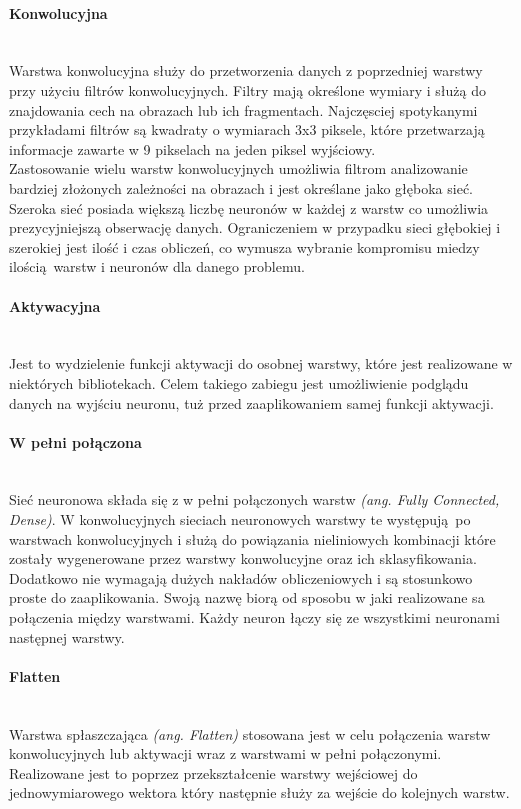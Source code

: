 \paragraph{Konwolucyjna}  \mbox{}\\
Warstwa konwolucyjna służy do przetworzenia danych z poprzedniej warstwy przy użyciu
filtrów konwolucyjnych. Filtry mają określone wymiary i służą do znajdowania cech
na obrazach lub ich fragmentach. Najczęsciej spotykanymi przykładami filtrów są
kwadraty o wymiarach 3x3 piksele, które przetwarzają informacje zawarte w 9 pikselach
na jeden piksel wyjściowy.\\
Zastosowanie wielu warstw konwolucyjnych umożliwia filtrom analizowanie bardziej złożonych
zależności na obrazach i jest określane jako głęboka sieć. Szeroka sieć posiada większą
liczbę neuronów w każdej z warstw co umożliwia prezycyjniejszą obserwację danych.
Ograniczeniem w przypadku sieci głębokiej i szerokiej jest ilość i czas obliczeń, co
wymusza wybranie kompromisu miedzy ilością warstw i neuronów dla danego problemu.

\paragraph{Aktywacyjna}  \mbox{}\\
Jest to wydzielenie funkcji aktywacji do osobnej warstwy, które jest realizowane
w niektórych bibliotekach. Celem takiego zabiegu jest umożliwienie podglądu danych
na wyjściu neuronu, tuż przed zaaplikowaniem samej funkcji aktywacji.

\paragraph{W pełni połączona}  \mbox{}\\
Sieć neuronowa składa się z w pełni połączonych warstw \textit{(ang. Fully Connected, Dense)}.
W konwolucyjnych sieciach neuronowych warstwy te występują po warstwach konwolucyjnych
i służą do powiązania nieliniowych kombinacji które zostały wygenerowane przez
warstwy konwolucyjne oraz ich sklasyfikowania. Dodatkowo nie wymagają dużych nakładów
obliczeniowych i są stosunkowo proste do zaaplikowania. Swoją nazwę biorą od sposobu w jaki
realizowane sa połączenia między warstwami. Każdy neuron łączy się ze wszystkimi neuronami
następnej warstwy.

\paragraph{Flatten}  \mbox{}\\
Warstwa spłaszczająca \textit{(ang. Flatten)} stosowana jest w celu połączenia warstw
konwolucyjnych lub aktywacji wraz z warstwami w pełni połączonymi. Realizowane jest
to poprzez przekształcenie warstwy wejściowej do jednowymiarowego wektora który następnie
służy za wejście do kolejnych warstw.

